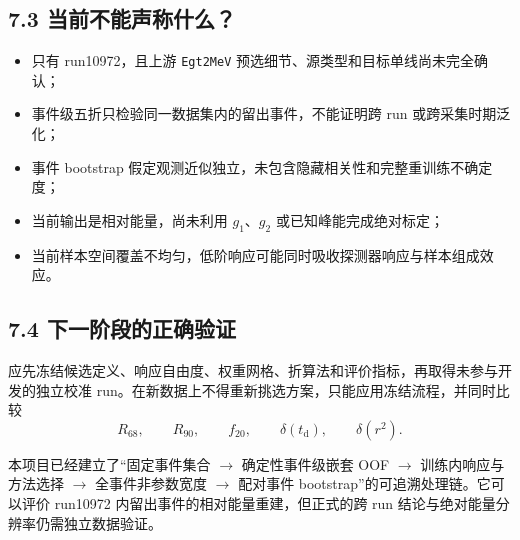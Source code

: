 \documentclass[UTF8,11pt,a4paper,oneside,fontset=none]{ctexart}
\newcommand{\Rsixtyeight}{R_{68}}
\newcommand{\Rninty}{R_{90}}
\begin{document}
\subsection*{7.3 当前不能声称什么？}

\begin{boundarybox}[title={必须保留的限制},fonttitle=\bfseries]
\begin{itemize}
  \item 只有 run10972，且上游 \texttt{Egt2MeV} 预选细节、源类型和目标单线尚未完全确认；
  \item 事件级五折只检验同一数据集内的留出事件，不能证明跨 run 或跨采集时期泛化；
  \item 事件 bootstrap 假定观测近似独立，未包含隐藏相关性和完整重训练不确定度；
  \item 当前输出是相对能量，尚未利用 $g_1$、$g_2$ 或已知峰能完成绝对标定；
  \item 当前样本空间覆盖不均匀，低阶响应可能同时吸收探测器响应与样本组成效应。
\end{itemize}
\end{boundarybox}

\subsection*{7.4 下一阶段的正确验证}

应先冻结候选定义、响应自由度、权重网格、折算法和评价指标，再取得未参与开发的独立校准 run。在新数据上不得重新挑选方案，只能应用冻结流程，并同时比较
\begin{equation}
  \Rsixtyeight,\qquad
  \Rninty,\qquad
  f_{20},\qquad
  \delta(t_{\mathrm d}),\qquad
  \delta(r^2).
\end{equation}

\begin{warningbox}[title={当前最严谨的总结},fonttitle=\bfseries]
本项目已经建立了“固定事件集合 $\rightarrow$ 确定性事件级嵌套 OOF $\rightarrow$ 训练内响应与方法选择 $\rightarrow$ 全事件非参数宽度 $\rightarrow$ 配对事件 bootstrap”的可追溯处理链。它可以评价 run10972 内留出事件的相对能量重建，但正式的跨 run 结论与绝对能量分辨率仍需独立数据验证。
\end{warningbox}
\end{document}
